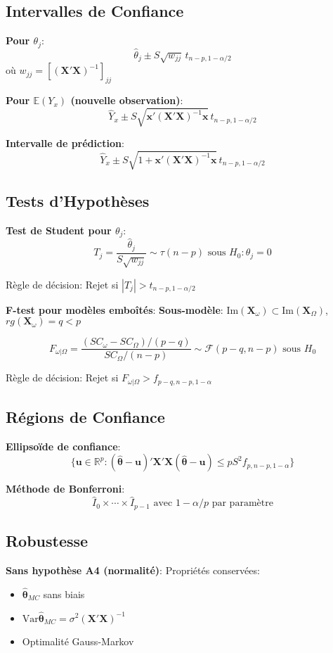 \documentclass[8pt,twocolumn]{article}
\newcommand{\mydef}[1]{\textcolor{defcolor}{\textbf{#1}}}
\newcommand{\myprop}[1]{\textcolor{propcolor}{\textbf{#1}}}
\newcommand{\R}{\mathbb{R}}
\newcommand{\E}{\mathbb{E}}
\newcommand{\Var}{\text{Var}}
\begin{document}
\subsection{Intervalles de Confiance}
\myprop{Pour $\theta_j$}:
$$\hat{\theta}_j \pm S\sqrt{w_{jj}}\,t_{n-p,1-\alpha/2}$$
où $w_{jj} = [(\mathbf{X}'\mathbf{X})^{-1}]_{jj}$

\myprop{Pour $\E(Y_x)$ (nouvelle observation)}:
$$\hat{Y}_x \pm S\sqrt{\mathbf{x}'(\mathbf{X}'\mathbf{X})^{-1}\mathbf{x}}\,t_{n-p,1-\alpha/2}$$

\myprop{Intervalle de prédiction}:
$$\hat{Y}_x \pm S\sqrt{1 + \mathbf{x}'(\mathbf{X}'\mathbf{X})^{-1}\mathbf{x}}\,t_{n-p,1-\alpha/2}$$

\subsection{Tests d'Hypothèses}
\myprop{Test de Student pour $\theta_j$}:
$$T_j = \frac{\hat{\theta}_j}{S\sqrt{w_{jj}}} \sim \tau(n-p) \text{ sous } H_0:\theta_j=0$$

Règle de décision: Rejet si $|T_j| > t_{n-p,1-\alpha/2}$

\myprop{F-test pour modèles emboîtés}:
\mydef{Sous-modèle}: $\text{Im}(\mathbf{X}_\omega) \subset \text{Im}(\mathbf{X}_\Omega)$, $rg(\mathbf{X}_\omega)=q<p$

$$F_{\omega|\Omega} = \frac{(SC_\omega - SC_\Omega)/(p-q)}{SC_\Omega/(n-p)} \sim \mathcal{F}(p-q,n-p) \text{ sous } H_0$$

Règle de décision: Rejet si $F_{\omega|\Omega} > f_{p-q,n-p,1-\alpha}$

\subsection{Régions de Confiance}
\myprop{Ellipsoïde de confiance}:
$$\{\mathbf{u} \in \R^p : (\hat{\boldsymbol{\theta}} - \mathbf{u})'\mathbf{X}'\mathbf{X}(\hat{\boldsymbol{\theta}} - \mathbf{u}) \leq pS^2 f_{p,n-p,1-\alpha}\}$$

\myprop{Méthode de Bonferroni}: 
$$\hat{I}_0 \times \cdots \times \hat{I}_{p-1} \text{ avec } 1-\alpha/p \text{ par paramètre}$$

\subsection{Robustesse}
\myprop{Sans hypothèse A4 (normalité)}:
Propriétés conservées:
\begin{itemize}[nosep]
\item $\hat{\boldsymbol{\theta}}_{MC}$ sans biais
\item $\Var\hat{\boldsymbol{\theta}}_{MC} = \sigma^2(\mathbf{X}'\mathbf{X})^{-1}$
\item Optimalité Gauss-Markov
\end{itemize}
\end{document}
